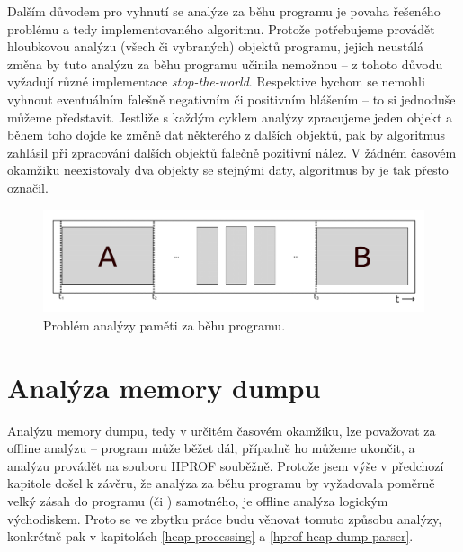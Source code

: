 Dalším důvodem pro vyhnutí se analýze za běhu programu je povaha řešeného problému a tedy implementovaného algoritmu. Protože potřebujeme provádět hloubkovou analýzu (všech či vybraných) objektů programu, jejich neustálá změna by tuto analýzu za běhu programu učinila nemožnou -- z tohoto důvodu vyžadují různé implementace  \textit{stop-the-world}. Respektive bychom se nemohli vyhnout eventuálním falešně negativním či positivním hlášením -- to si jednoduše můžeme představit. Jestliže s každým cyklem analýzy zpracujeme jeden objekt a během toho dojde ke změně dat některého z dalších objektů, pak by algoritmus zahlásil při zpracování dalších objektů falečně pozitivní nález. V žádném časovém okamžiku neexistovaly dva objekty se stejnými daty, algoritmus by je tak přesto označil.


\begin{figure}[h]
	\centering
	\includegraphics[scale=0.5]{obrazky/runtime-analysis.png}
	\caption{Problém analýzy paměti za běhu programu.}
	\label{obrRuntimeAnalysis}
\end{figure}

\section{Analýza memory dumpu}
Analýzu memory dumpu, tedy  v určitém časovém okamžiku, lze považovat za offline analýzu -- program může běžet dál, případně ho můžeme ukončit, a analýzu provádět na souboru HPROF souběžně. Protože jsem výše v předchozí kapitole došel k závěru, že analýza za běhu programu by vyžadovala poměrně velký zásah do programu (či ) samotného, je offline analýza logickým východiskem. Proto se ve zbytku práce budu věnovat tomuto způsobu analýzy, konkrétně pak v kapitolách \ref{heap-processing} a \ref{hprof-heap-dump-parser}.




